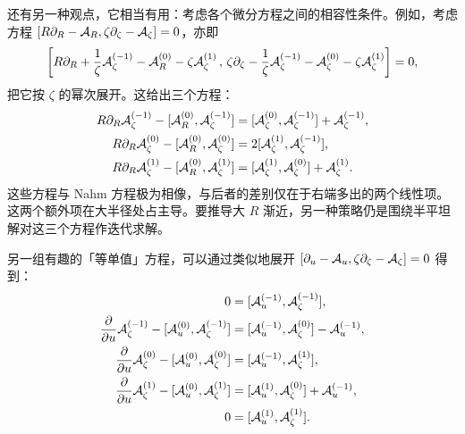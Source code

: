 还有另一种观点，它相当有用：考虑各个微分方程之间的相容性条件。例如，考虑方程 $[R\partial_R - \mathcal{A}_R, \zeta \partial_\zeta - \mathcal{A}_\zeta] = 0$，亦即
\begin{equation} \left[ R\partial_{R} + \frac{1}{\zeta} {\mathcal{A}_{\zeta}^{(-1)}} - \mathcal{A}_R^{(0)} -
\zeta \mathcal{A}^{(1)}_{\zeta} \, , \, \zeta\partial_{\zeta} -
\frac{1}{\zeta} {\mathcal{A}_{\zeta}^{(-1)}} - \mathcal{A}_{\zeta}^{(0)} - \zeta
\mathcal{A}^{(1)}_{\zeta} \right] = 0,
\end{equation}
把它按 $\zeta$ 的幂次展开。这给出三个方程：
\begin{align}
R\partial_{R} \mathcal{A}_{\zeta}^{(-1)} - [\mathcal{A}_R^{(0)},\mathcal{A}_{\zeta}^{(-1)}] &=
[\mathcal{A}_{\zeta}^{(0)},\mathcal{A}_{\zeta}^{(-1)}] + \mathcal{A}_{\zeta}^{(-1)},\\
R\partial_{R} \mathcal{A}_{\zeta}^{(0)} - [\mathcal{A}_R^{(0)},\mathcal{A}_{\zeta}^{(0)}] &=
2 [\mathcal{A}_{\zeta}^{(1)},\mathcal{A}_{\zeta}^{(-1)}],\\
R\partial_{R} \mathcal{A}_{\zeta}^{(1)} - [\mathcal{A}_R^{(0)},\mathcal{A}_{\zeta}^{(1)}] &=
[\mathcal{A}_{\zeta}^{(1)},\mathcal{A}_{\zeta}^{(0)}] + \mathcal{A}_{\zeta}^{(1)}.
\end{align}
这些方程与 Nahm 方程极为相像，与后者的差别仅在于右端多出的两个线性项。这两个额外项在大半径处占主导。要推导大 $R$ 渐近，另一种策略仍是围绕半平坦解对这三个方程作迭代求解。

另一组有趣的「等单值」方程，可以通过类似地展开 $[\partial_u - \mathcal{A}_u, \zeta\partial_\zeta - \mathcal{A}_\zeta] = 0$ 得到：
\begin{align}
0 &=[\mathcal{A}^{(-1)}_u, \mathcal{A}^{(-1)}_\zeta], \\
\frac{\partial}{\partial u} \mathcal{A}_{\zeta}^{(-1)} -
[\mathcal{A}_u^{(0)},\mathcal{A}_{\zeta}^{(-1)}] &=
[\mathcal{A}_u^{(-1)},\mathcal{A}_{\zeta}^{(0)}] - \mathcal{A}_{u}^{(-1)},\\
\frac{\partial}{\partial u} \mathcal{A}_{\zeta}^{(0)} -
[\mathcal{A}_u^{(0)},\mathcal{A}_{\zeta}^{(0)}]  &=
[\mathcal{A}_u^{(-1)},\mathcal{A}_{\zeta}^{(1)}], \\
\frac{\partial}{\partial u} \mathcal{A}_{\zeta}^{(1)} -
[\mathcal{A}_u^{(0)},\mathcal{A}_{\zeta}^{(1)}] &=
[\mathcal{A}_u^{(1)},\mathcal{A}_{\zeta}^{(0)}] + \mathcal{A}_{u}^{(-1)}, \\
0 &= [\mathcal{A}^{(1)}_u, \mathcal{A}^{(1)}_\zeta].
\end{align}
